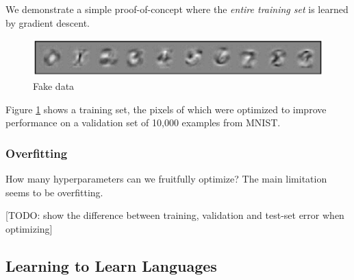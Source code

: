 \documentclass{article}
\begin{document}
We demonstrate a simple proof-of-concept where the \emph{entire training set} is learned by gradient descent.
%
\begin{figure}[h!]
\begin{center}
\includegraphics[width=\columnwidth]{../experiments/Jan_19_optimize_data/4/fake_data.pdf}
\caption{Fake data}
\label{fig:fake data}
\end{center}
\end{figure} 
%
Figure \ref{fig:fake data} shows a training set, the pixels of which were optimized to improve performance on a validation set of 10,000 examples from MNIST.


\subsubsection{Overfitting}

How many hyperparameters can we fruitfully optimize?
The main limitation seems to be overfitting.

[TODO: show the difference between training, validation and test-set error when optimizing]


\subsection{Learning to Learn Languages}
\end{document}
